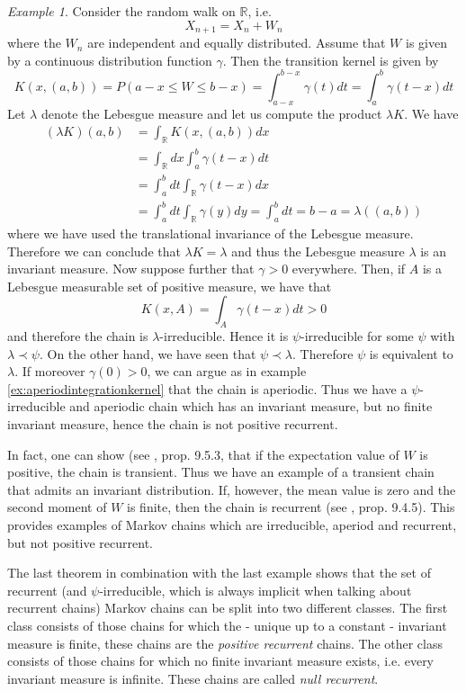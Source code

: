 \documentclass[a4paper, draft]{article}
\theoremstyle{own}
\theoremstyle{remark}
\newtheorem{example}{Example}[section]
\newcommand{\R}{\mathbb{R}}
\begin{document}
\begin{example}
	Consider the random walk on $\R$, i.e.
	$$
	X_{n+1} = X_n + W_n
	$$
	where the $W_n$ are independent and equally distributed. Assume that $W$ is given by a continuous distribution function $\gamma$. Then the transition kernel is given by
	$$
	K(x,(a, b)) = P(a-x \leq W \leq b-x) = \int_{a-x}^{b-x} \gamma(t) dt = \int_a^b \gamma(t-x) dt
	$$
	Let $\lambda$ denote the Lebesgue measure and let us compute the product $\lambda K$. We have
	\begin{align*}
	(\lambda K)(a,b) & = \int_{\R}  K(x,(a,b)) dx  \\
	&= \int_{\R} dx \int_a^b \gamma(t-x) dt \\
	&= \int_a^b dt \int_{\R} \gamma(t-x) dx \\
	& = \int_a^b dt \int_{\R} \gamma(y) dy =  \int_a^b dt = b - a = \lambda((a,b))
	\end{align*}
	where we have used the translational invariance of the Lebesgue measure. Therefore we can conclude that $\lambda K = \lambda$ and thus the Lebesgue measure $\lambda$ is an invariant measure.  
	Now suppose further that $\gamma > 0$ everywhere. Then, if $A$ is a Lebesgue measurable set of positive measure, we have that
	$$
	K(x,A) = \int_A \gamma(t-x) dt > 0
	$$
	and therefore the chain is $\lambda$-irreducible. Hence it is $\psi$-irreducible for some $\psi$ with $\lambda \prec \psi$. On the other hand, we have seen that $\psi \prec \lambda$. Therefore $\psi$ is equivalent to $\lambda$. If moreover $\gamma(0) > 0$, we can argue as in example
	\ref{ex:aperiodintegrationkernel} that the chain is aperiodic. Thus we have a $\psi$-irreducible and aperiodic chain which has an invariant measure, but no finite invariant measure, hence the chain is not positive recurrent. 
	
	In fact, one can show (see \cite{MeynTweedie}, prop. 9.5.3, that if the expectation value of $W$ is positive, the chain is transient. Thus we have an example
	of a transient chain that admits an invariant distribution. If, however, the mean value is zero and the second moment of $W$ is finite, then the chain is recurrent (see \cite{MeynTweedie}, 
	prop. 9.4.5). This provides examples of Markov chains which are irreducible, aperiod and recurrent, but not positive recurrent. 
\end{example}

The last theorem in combination with the last example shows that the set of recurrent (and $\psi$-irreducible, which is always implicit when talking about recurrent chains) Markov chains can be split into two different classes. The first class consists of those chains for which the - unique up to a constant - invariant measure is finite, these chains are the {\em positive recurrent} chains. The other class consists of those chains for which no finite invariant measure exists, i.e. every invariant measure is infinite. These chains are called {\em null recurrent}.
\end{document}
